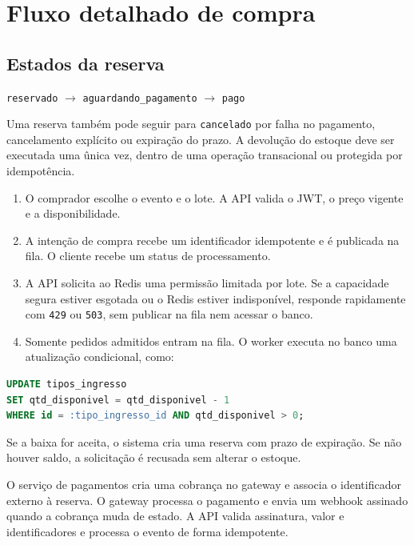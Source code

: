 \documentclass[12pt,a4paper]{article}
\begin{document}
\section{Fluxo detalhado de compra}

\subsection{Estados da reserva}

\texttt{reservado} $\rightarrow$ \texttt{aguardando\_pagamento} $\rightarrow$ \texttt{pago}

Uma reserva tamb\'em pode seguir para \texttt{cancelado} por falha no pagamento, cancelamento expl\'icito ou expira\c{c}\~ao do prazo. A devolu\c{c}\~ao do estoque deve ser executada uma \^unica vez, dentro de uma opera\c{c}\~ao transacional ou protegida por idempot\^encia.

\begin{enumerate}
  \item O comprador escolhe o evento e o lote. A API valida o JWT, o pre\c{c}o vigente e a disponibilidade.
  \item A inten\c{c}\~ao de compra recebe um identificador idempotente e \'e publicada na fila. O cliente recebe um status de processamento.
  \item A API solicita ao Redis uma permiss\~ao limitada por lote. Se a capacidade segura estiver esgotada ou o Redis estiver indispon\'ivel, responde rapidamente com \texttt{429} ou \texttt{503}, sem publicar na fila nem acessar o banco.
  \item Somente pedidos admitidos entram na fila. O worker executa no banco uma atualiza\c{c}\~ao condicional, como:
\end{enumerate}

\begin{lstlisting}[language=SQL]
UPDATE tipos_ingresso
SET qtd_disponivel = qtd_disponivel - 1
WHERE id = :tipo_ingresso_id AND qtd_disponivel > 0;
\end{lstlisting}

Se a baixa for aceita, o sistema cria uma reserva com prazo de expira\c{c}\~ao. Se n\~ao houver saldo, a solicita\c{c}\~ao \'e recusada sem alterar o estoque.

O servi\c{c}o de pagamentos cria uma cobran\c{c}a no gateway e associa o identificador externo \`a reserva. O gateway processa o pagamento e envia um webhook assinado quando a cobran\c{c}a muda de estado. A API valida assinatura, valor e identificadores e processa o evento de forma idempotente.
\end{document}
